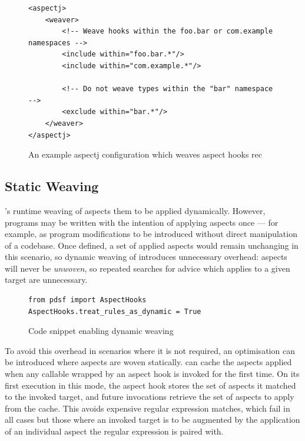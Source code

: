 \begin{figure}
\begin{lstlisting}[style=footnotesize_xml]
<aspectj>
    <weaver>
        <!-- Weave hooks within the foo.bar or com.example namespaces -->
        <include within="foo.bar.*"/>
        <include within="com.example.*"/>

        <!-- Do not weave types within the "bar" namespace -->
        <exclude within="bar.*"/>
    </weaver>
</aspectj>
\end{lstlisting}
\caption{An example aspectj configuration which weaves aspect hooks rec}
\label{fig:aspectj_configuration_for_hook_nesting}
\end{figure}


\subsection{Static Weaving}
\label{static_weaving}

\pdsfthree{}'s runtime weaving of aspects them to be applied dynamically. However,
programs may be written with the intention of applying aspects once --- for
example, as program modifications to be introduced without direct manipulation
of a codebase. Once defined, a set of applied aspects would remain unchanging in
this scenario, so dynamic weaving of \pdsfthree introduces unnecessary overhead:
aspects will never be \emph{unwoven}, so repeated searches for advice which
applies to a given target are unnecessary. 

\begin{figure}[h]
    \begin{lstlisting}[style=footnotesize_python]
from pdsf import AspectHooks
AspectHooks.treat_rules_as_dynamic = True
    \end{lstlisting}
    \caption{Code snippet enabling dynamic weaving}
    \label{fig:enabling_dynamic_weaving}
\end{figure}

To avoid this overhead in scenarios where it is not required, an optimisation
can be introduced where aspects are woven statically. \pdsfthree can cache the
aspects applied when any callable wrapped by an aspect hook is invoked for the
first time. On its first execution in this mode, the aspect hook stores the set
of aspects it matched to the invoked target, and future invocations retrieve the
set of aspects to apply from the cache. This avoids expensive regular expression
matches,
which fail in all cases but those where an invoked target is to be augmented by
the application of an individual aspect the regular expression is paired
with.

